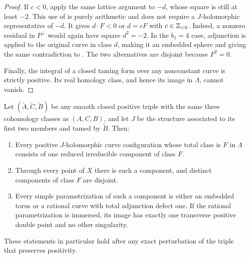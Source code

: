 \begin{proof}
If \(c<0\), apply the same lattice argument to \(-d\), whose square
is still at least \(-2\).  This use of
 is purely arithmetic and does not require
a \(J\)-holomorphic representative of \(-d\).  It gives
\(d\cdot F<0\) or \(d=cF\) with \(c\in\mathbb Z_{<0}\).
Indeed, a nonzero residual in \(P^\perp\) would again have square
\(d^2=-2\).  In the \(b_1=4\) case, adjunction is applied to the
original curve in class \(d\), making it an embedded sphere and giving
the same contradiction to .
The two alternatives are disjoint because \(F^2=0\).

Finally, the integral of a closed taming form over any nonconstant
curve is strictly positive.  Its real homology class, and hence its
image in \(\Lambda\), cannot vanish.
\end{proof}

\begin{proposition}
\label{prop:nonsplitting}
Let \((\widetilde A,\widetilde C,\widetilde B)\) be any smooth closed
positive triple with the same three cohomology classes as \((A,C,B)\),
and let \(J\) be the structure associated to its first two members
and tamed by \(\widetilde B\).  Then:
\begin{enumerate}[label=\textup{(\roman*)}]
\item Every positive \(J\)-holomorphic curve configuration whose
  total class is \(F\) in \(\Lambda\) consists of one reduced
  irreducible component of class \(F\).
\item Through every point of \(X\) there is such a component, and
  distinct components of class \(F\) are disjoint.
\item Every simple parametrization of such a component is either an
  embedded torus or a rational curve with total adjunction defect
  one.  If the rational parametrization is immersed, its image has
  exactly one transverse positive double point and no other
  singularity.
\end{enumerate}
These statements in particular hold after any exact perturbation of
the triple that preserves positivity.
\end{proposition}

